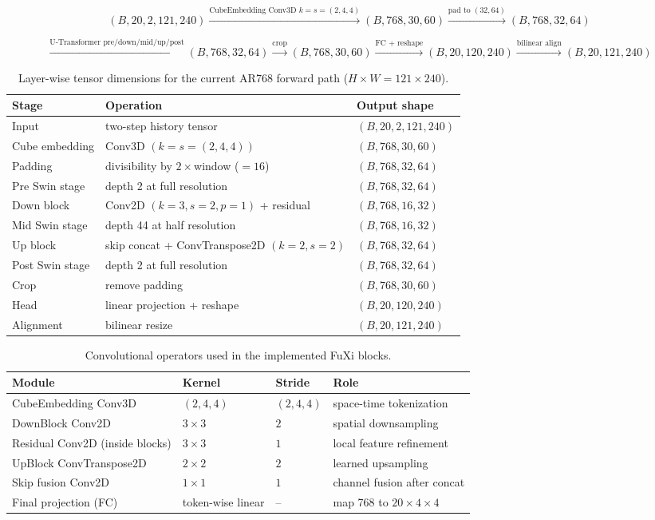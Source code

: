 \documentclass[12pt]{report}
\begin{document}
\[
(B,20,2,121,240)
\xrightarrow{\text{CubeEmbedding Conv3D }k=s=(2,4,4)}
(B,768,30,60)
\xrightarrow{\text{pad to }(32,64)}
(B,768,32,64)
\]

\[
\xrightarrow{\text{U-Transformer pre/down/mid/up/post}}
(B,768,32,64)
\xrightarrow{\text{crop}}
(B,768,30,60)
\xrightarrow{\text{FC + reshape}}
(B,20,120,240)
\xrightarrow{\text{bilinear align}}
(B,20,121,240)
\]

\begin{table}[H]
\centering
\caption{Layer-wise tensor dimensions for the current AR768 forward path ($H\times W=121\times240$).}
\begin{tabular}{lll}
\hline
\textbf{Stage} & \textbf{Operation} & \textbf{Output shape} \\
\hline
Input & two-step history tensor & $(B,20,2,121,240)$ \\
Cube embedding & Conv3D $(k=s=(2,4,4))$ & $(B,768,30,60)$ \\
Padding & divisibility by $2\times$window ($=16$) & $(B,768,32,64)$ \\
Pre Swin stage & depth 2 at full resolution & $(B,768,32,64)$ \\
Down block & Conv2D $(k=3,s=2,p=1)$ + residual & $(B,768,16,32)$ \\
Mid Swin stage & depth 44 at half resolution & $(B,768,16,32)$ \\
Up block & skip concat + ConvTranspose2D $(k=2,s=2)$ & $(B,768,32,64)$ \\
Post Swin stage & depth 2 at full resolution & $(B,768,32,64)$ \\
Crop & remove padding & $(B,768,30,60)$ \\
Head & linear projection + reshape & $(B,20,120,240)$ \\
Alignment & bilinear resize & $(B,20,121,240)$ \\
\hline
\end{tabular}
\end{table}

\begin{table}[H]
\centering
\caption{Convolutional operators used in the implemented FuXi blocks.}
\begin{tabular}{llll}
\hline
\textbf{Module} & \textbf{Kernel} & \textbf{Stride} & \textbf{Role} \\
\hline
CubeEmbedding Conv3D & $(2,4,4)$ & $(2,4,4)$ & space-time tokenization \\
DownBlock Conv2D & $3\times3$ & $2$ & spatial downsampling \\
Residual Conv2D (inside blocks) & $3\times3$ & $1$ & local feature refinement \\
UpBlock ConvTranspose2D & $2\times2$ & $2$ & learned upsampling \\
Skip fusion Conv2D & $1\times1$ & $1$ & channel fusion after concat \\
Final projection (FC) & token-wise linear & -- & map 768 to $20\times4\times4$ \\
\hline
\end{tabular}
\end{table}
\end{document}
